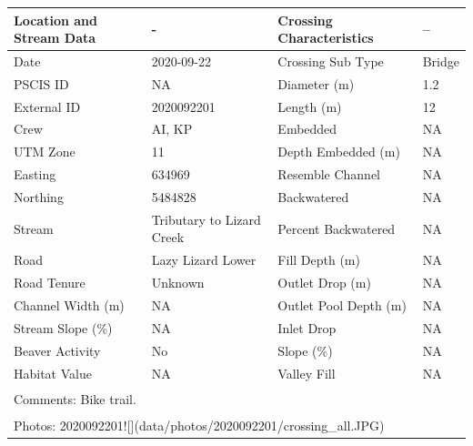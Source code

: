 \documentclass[
]{book}
\begin{document}
\begin{tabular}{llll}
\toprule
Location and Stream Data & - & Crossing Characteristics & --\\
\midrule
Date & 2020-09-22 & Crossing Sub Type & Bridge\\
PSCIS ID & NA & Diameter (m) & 1.2\\
External ID & 2020092201 & Length (m) & 12\\
Crew & AI, KP & Embedded & NA\\
UTM Zone & 11 & Depth Embedded (m) & NA\\
\addlinespace
Easting & 634969 & Resemble Channel & NA\\
Northing & 5484828 & Backwatered & NA\\
Stream & Tributary to Lizard Creek & Percent Backwatered & NA\\
Road & Lazy Lizard Lower & Fill Depth (m) & NA\\
Road Tenure & Unknown & Outlet Drop (m) & NA\\
\addlinespace
Channel Width (m) & NA & Outlet Pool Depth (m) & NA\\
Stream Slope (\%) & NA & Inlet Drop & NA\\
Beaver Activity & No & Slope (\%) & NA\\
Habitat Value & NA & Valley Fill & NA\\
\bottomrule
\multicolumn{4}{l}{\textsuperscript{} Comments: Bike trail.}\\
\multicolumn{4}{l}{\textsuperscript{} Photos: 2020092201![](data/photos/2020092201/crossing\_all.JPG)}\\
\end{tabular}
\end{document}
